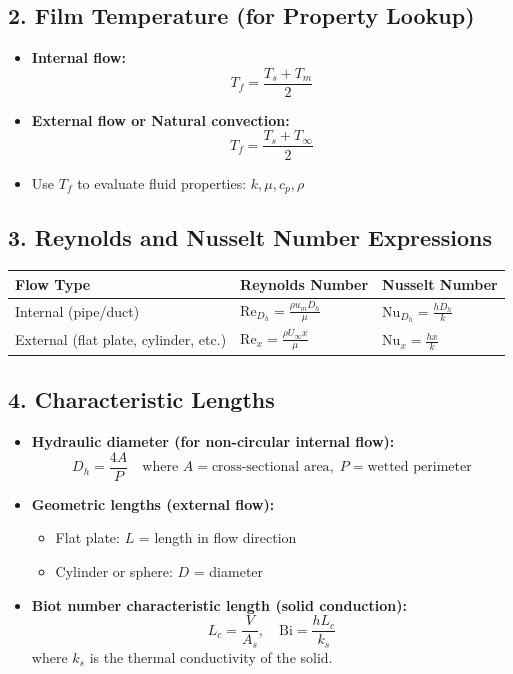 \subsection*{2. Film Temperature (for Property Lookup)}

\begin{itemize}
    \item \textbf{Internal flow:}
    \[
    T_f = \frac{T_s + T_m}{2}
    \]

    \item \textbf{External flow or Natural convection:}
    \[
    T_f = \frac{T_s + T_\infty}{2}
    \]

    \item Use \( T_f \) to evaluate fluid properties: \( k, \mu, c_p, \rho \)
\end{itemize}

\subsection*{3. Reynolds and Nusselt Number Expressions}

\begin{table}[h!]
\centering
\begin{tabular}{@{}lll@{}}
\toprule
\textbf{Flow Type} & \textbf{Reynolds Number} & \textbf{Nusselt Number} \\
\midrule
Internal (pipe/duct) & \( \displaystyle \mathrm{Re}_{D_h} = \frac{\rho u_m D_h}{\mu} \) & \( \displaystyle \mathrm{Nu}_{D_h} = \frac{h D_h}{k} \) \\
External (flat plate, cylinder, etc.) & \( \displaystyle \mathrm{Re}_x = \frac{\rho U_\infty x}{\mu} \) & \( \displaystyle \mathrm{Nu}_x = \frac{h x}{k} \) \\
\bottomrule
\end{tabular}
\end{table}

\subsection*{4. Characteristic Lengths}

\begin{itemize}
    \item \textbf{Hydraulic diameter (for non-circular internal flow):}
    \[
    D_h = \frac{4A}{P}
    \quad \text{where } A = \text{cross-sectional area},\; P = \text{wetted perimeter}
    \]

    \item \textbf{Geometric lengths (external flow):}
    \begin{itemize}
        \item Flat plate: \( L \) = length in flow direction
        \item Cylinder or sphere: \( D \) = diameter
    \end{itemize}

    \item \textbf{Biot number characteristic length (solid conduction):}
    \[
    L_c = \frac{V}{A_s}, \quad \mathrm{Bi} = \frac{h L_c}{k_s}
    \]
    where \( k_s \) is the thermal conductivity of the solid.
\end{itemize}

